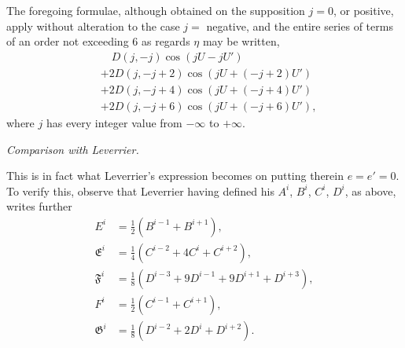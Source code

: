 \documentclass[11pt]{article}
\begin{document}
The foregoing formulae, although obtained on the supposition $j=0$, or
positive, apply without alteration to the case $j=$ negative, and the
entire series of terms of an order not exceeding $6$ as regards $\eta$
may be written,
\begin{align*}
&\quad D(j,-j)\cos(jU-jU')\\
&+2D(j,-j+2)\cos(jU+(-j+2)U')\\
&+2D(j,-j+4)\cos(jU+(-j+4)U')\\
&+2D(j,-j+6)\cos(jU+(-j+6)U'),
\end{align*}
where $j$ has every integer value from $-\infty$ to $+\infty$.

\medskip

\begin{center}\textit{Comparison with Leverrier.}\end{center}

\medskip

This is in fact what Leverrier's expression becomes on putting therein
$e=e'=0$. To verify this, observe that Leverrier having defined his
$A^{i}$, $B^{i}$, $C^{i}$, $D^{i}$, as above, writes further
\begin{align*}
E^{i} &= \tfrac{1}{2}(B^{i-1}+B^{i+1}),\\
\mathfrak{E}^{i} &= \tfrac{1}{4}(C^{i-2}+4C^{i}+C^{i+2}),\\
\mathfrak{F}^{i} &= \tfrac{1}{8}(D^{i-3}+9D^{i-1}+9D^{i+1}+D^{i+3}),\\
F^{i} &= \tfrac{1}{2}(C^{i-1}+C^{i+1}),\\
\mathfrak{G}^{i} &= \tfrac{1}{8}(D^{i-2}+2D^{i}+D^{i+2}).
\end{align*}
\end{document}
